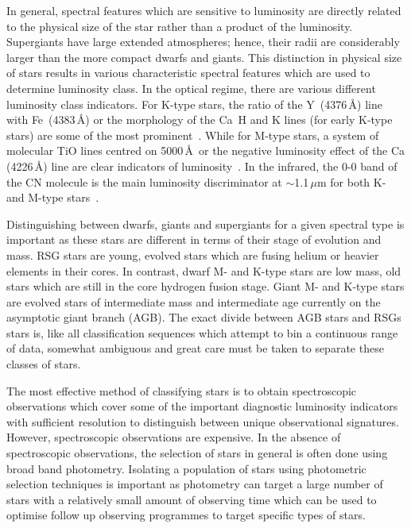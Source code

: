 {In general, spectral features which are sensitive to luminosity are directly related to the physical size of the star rather than a product of the luminosity.
Supergiants have large extended atmospheres; hence, their radii are considerably larger than the more compact dwarfs and giants.
This distinction in physical size of stars results in various characteristic spectral features which are used to determine luminosity class.
In the optical regime, there are various different luminosity class indicators.
For K-type stars, the ratio of the Y\,\2 (4376\,\AA) line with Fe\,\1 (4383\,\AA) or the morphology of the Ca\,\2 H and K lines (for early K-type stars) are some of the most prominent~\citep{b:GrayCorbally}.
While for M-type stars, a system of molecular TiO lines centred on 5000\,\AA ~or the negative luminosity effect of the Ca\,\1 (4226\,\AA) line are clear indicators of luminosity~\citep{b:GrayCorbally}.
In the infrared, the 0-0 band of the CN molecule is the main luminosity discriminator at $\sim$1.1\,$\mu$m for both K- and M-type stars~\citep{b:GrayCorbally}.




Distinguishing between dwarfs, giants and supergiants for a given spectral type is important as these stars are different in terms of their stage of evolution and mass.
RSG stars are young, evolved stars which are fusing helium or heavier elements in their cores.
In contrast, dwarf M- and K-type stars are low mass, old stars which are still in the core hydrogen fusion stage.
Giant M- and K-type stars are evolved stars of intermediate mass and intermediate age currently on the asymptotic giant branch (AGB).
The exact divide between AGB stars and RSGs stars is, like all classification sequences which attempt to bin a continuous range of data, somewhat ambiguous and great care must be taken to separate these classes of stars.

The most effective method of classifying stars is to obtain spectroscopic observations which cover some of the important diagnostic luminosity indicators with sufficient resolution to distinguish between unique observational signatures.
However, spectroscopic observations are expensive.
In the absence of spectroscopic observations, the selection of stars in general is often done using broad band photometry.
Isolating a population of stars using photometric selection techniques is important as photometry can target a large number of stars with a relatively small amount of observing time which can be used to optimise follow up observing programmes to target specific types of stars.

}
